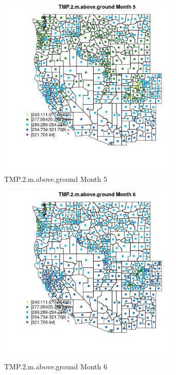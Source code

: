 \begin{figure} 
\centering  
\includegraphics[width=0.77\textwidth]{Code_Outputs/df_report_ML_predictors_CountyCentroid_Locations_Dates_2008-01-01to2018-12-31_MapObsMo5TMP2maboveground.jpg} 
\caption{\label{fig:df_report_ML_predictors_CountyCentroid_Locations_Dates_2008-01-01to2018-12-31MapObsMo5TMP2maboveground}TMP.2.m.above.ground Month 5} 
\end{figure} 
 

\clearpage 

\begin{figure} 
\centering  
\includegraphics[width=0.77\textwidth]{Code_Outputs/df_report_ML_predictors_CountyCentroid_Locations_Dates_2008-01-01to2018-12-31_MapObsMo6TMP2maboveground.jpg} 
\caption{\label{fig:df_report_ML_predictors_CountyCentroid_Locations_Dates_2008-01-01to2018-12-31MapObsMo6TMP2maboveground}TMP.2.m.above.ground Month 6} 
\end{figure} 
 


